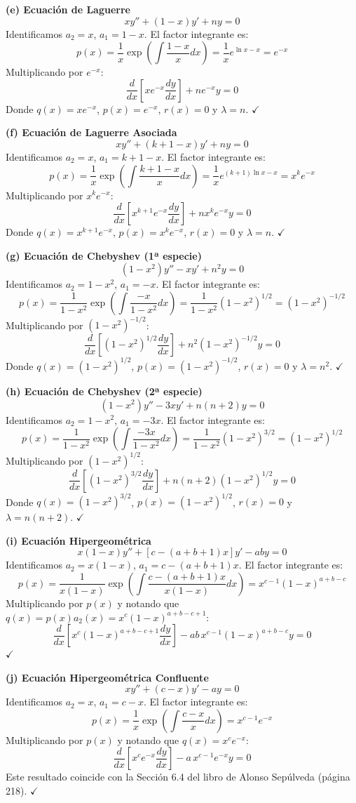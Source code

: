 \documentclass[a4paper]{article}
\begin{document}
\textbf{(e) Ecuación de Laguerre}
$$ xy'' + (1 - x)y' + ny = 0 $$
Identificamos $a_2 = x$, $a_1 = 1 - x$. El factor integrante es:
$$ p(x) = \frac{1}{x} \exp\left( \int \frac{1-x}{x} dx \right) = \frac{1}{x} e^{\ln x - x} = e^{-x} $$
Multiplicando por $e^{-x}$:
$$ \boxed{\frac{d}{dx}\left[ x e^{-x} \frac{dy}{dx} \right] + n e^{-x} y = 0} $$
Donde $q(x)=xe^{-x}$, $p(x)=e^{-x}$, $r(x)=0$ y $\lambda = n$. $\checkmark$

\textbf{(f) Ecuación de Laguerre Asociada}
$$ xy'' + (k+1 - x)y' + ny = 0 $$
Identificamos $a_2 = x$, $a_1 = k+1 - x$. El factor integrante es:
$$ p(x) = \frac{1}{x} \exp\left( \int \frac{k+1-x}{x} dx \right) = \frac{1}{x} e^{(k+1)\ln x - x} = x^k e^{-x} $$
Multiplicando por $x^k e^{-x}$:
$$ \boxed{\frac{d}{dx}\left[ x^{k+1} e^{-x} \frac{dy}{dx} \right] + n x^k e^{-x} y = 0} $$
Donde $q(x)=x^{k+1}e^{-x}$, $p(x)=x^k e^{-x}$, $r(x)=0$ y $\lambda = n$. $\checkmark$

\textbf{(g) Ecuación de Chebyshev (1ª especie)}
$$ (1 - x^2)y'' - xy' + n^2y = 0 $$
Identificamos $a_2 = 1 - x^2$, $a_1 = -x$. El factor integrante es:
$$ p(x) = \frac{1}{1-x^2} \exp\left( \int \frac{-x}{1-x^2} dx \right) = \frac{1}{1-x^2} (1-x^2)^{1/2} = (1-x^2)^{-1/2} $$
Multiplicando por $(1-x^2)^{-1/2}$:
$$ \boxed{\frac{d}{dx}\left[ (1 - x^2)^{1/2} \frac{dy}{dx} \right] + n^2 (1 - x^2)^{-1/2} y = 0} $$
Donde $q(x)=(1-x^2)^{1/2}$, $p(x)=(1-x^2)^{-1/2}$, $r(x)=0$ y $\lambda = n^2$. $\checkmark$

\textbf{(h) Ecuación de Chebyshev (2ª especie)}
$$ (1 - x^2)y'' - 3xy' + n(n+2)y = 0 $$
Identificamos $a_2 = 1 - x^2$, $a_1 = -3x$. El factor integrante es:
$$ p(x) = \frac{1}{1-x^2} \exp\left( \int \frac{-3x}{1-x^2} dx \right) = \frac{1}{1-x^2} (1-x^2)^{3/2} = (1-x^2)^{1/2} $$
Multiplicando por $(1-x^2)^{1/2}$:
$$ \boxed{\frac{d}{dx}\left[ (1 - x^2)^{3/2} \frac{dy}{dx} \right] + n(n+2) (1 - x^2)^{1/2} y = 0} $$
Donde $q(x)=(1-x^2)^{3/2}$, $p(x)=(1-x^2)^{1/2}$, $r(x)=0$ y $\lambda = n(n+2)$. $\checkmark$

\textbf{(i) Ecuación Hipergeométrica}
$$ x(1 - x)y'' + [c - (a+b+1)x]y' - aby = 0 $$
Identificamos $a_2 = x(1-x)$, $a_1 = c - (a+b+1)x$. El factor integrante es:
$$ p(x) = \frac{1}{x(1-x)} \exp\left( \int \frac{c - (a+b+1)x}{x(1-x)} dx \right) = x^{c-1} (1-x)^{a+b-c} $$
Multiplicando por $p(x)$ y notando que $q(x) = p(x)a_2(x) = x^c (1-x)^{a+b-c+1}$:
$$ \boxed{\frac{d}{dx}\left[ x^c (1 - x)^{a+b-c+1} \frac{dy}{dx} \right] - ab \, x^{c-1} (1 - x)^{a+b-c} y = 0} $$
$\checkmark$

\textbf{(j) Ecuación Hipergeométrica Confluente}
$$ xy'' + (c - x)y' - ay = 0 $$
Identificamos $a_2 = x$, $a_1 = c - x$. El factor integrante es:
$$ p(x) = \frac{1}{x} \exp\left( \int \frac{c-x}{x} dx \right) = x^{c-1} e^{-x} $$
Multiplicando por $p(x)$ y notando que $q(x) = x^c e^{-x}$:
$$ \boxed{\frac{d}{dx}\left[ x^c e^{-x} \frac{dy}{dx} \right] - a \, x^{c-1} e^{-x} y = 0} $$
Este resultado coincide con la Sección 6.4 del libro de Alonso Sepúlveda (página 218). $\checkmark$
\end{document}
